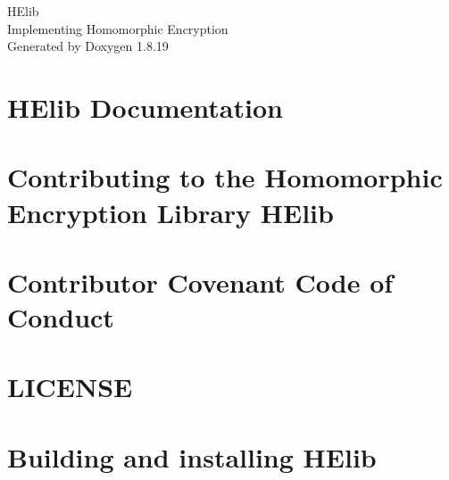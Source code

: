 \let\mypdfximage\pdfximage\def\pdfximage{\immediate\mypdfximage}\documentclass[twoside]{book}
\newcommand{\+}{\discretionary{\mbox{\scriptsize$\hookleftarrow$}}{}{}}
\newcommand{\clearemptydoublepage}{%
  \newpage{\pagestyle{empty}\cleardoublepage}%
}
\begin{document}
\hypersetup{pageanchor=false,
             bookmarksnumbered=true,
             pdfencoding=unicode
            }
\begin{titlepage}
\vspace*{7cm}
\begin{center}%
{\Large H\+Elib \\[1ex]\large Implementing Homomorphic Encryption }\\
\vspace*{1cm}
{\large Generated by Doxygen 1.8.19}\\
\end{center}
\end{titlepage}
\clearemptydoublepage
{}
\tableofcontents
\clearemptydoublepage
{}
\hypersetup{pageanchor=true}

\chapter{H\+Elib Documentation}
\label{index}\hypertarget{index}{}
\chapter{Contributing to the Homomorphic Encryption Library H\+Elib}
\label{md___users_flavio_tmp_documentation-update__h_elib__c_o_n_t_r_i_b_u_t_i_n_g}

\chapter{Contributor Covenant Code of Conduct}
\label{md___users_flavio_tmp_documentation-update__h_elib__c_o_d_e__o_f__c_o_n_d_u_c_t}

\chapter{L\+I\+C\+E\+N\+SE}
\label{md___users_flavio_tmp_documentation-update__h_elib__l_i_c_e_n_s_e}

\chapter{Building and installing H\+Elib}
\label{md___users_flavio_tmp_documentation-update__h_elib__i_n_s_t_a_l_l}

\end{document}
